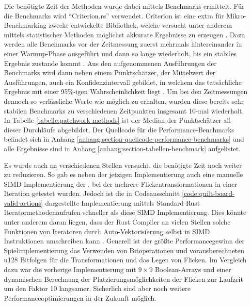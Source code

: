 Die benötigte Zeit der Methoden wurde dabei mittels Benchmarks ermittelt. Für die Benchmarks wird \enquote{Criterion.rs} verwendet. Criterion ist eine extra für Mikro-Benchmarking zwecke entwickelte Bibliothek, welche versucht unter anderem mittels statistischer Methoden möglichst akkurate Ergebnisse zu erzeugen \cite{2018.Criterion}. Dazu werden alle Benchmarks vor der Zeitmessung zuerst mehrmals hintereinander in einer Warmup-Phase ausgeführt und dann so lange wiederholt, bis ein stabiles Ergebnis zustande kommt \cite{2018.CriterionAnalysis}. Aus den aufgenommenen Ausführungen der Benchmarks wird dann neben einem Punktschätzer, der Mittelwert der Ausführungen, auch ein Konfidenzintervall gebildet, in welchem das tatsächliche Ergebnis mit einer 95\%-igen Wahrscheinlichkeit liegt \cite{2019.CriterionOutput}. Um bei den Zeitmessungen dennoch so verlässliche Werte wie möglich zu erhalten, wurden diese bereits sehr stabilen Benchmarks zu verschiedenen Zeitpunkten insgesamt 10-mal wiederholt. In Tabelle \ref{tabelle:patchwork-methods} ist der Median der Punktschätzer all dieser Durchläufe abgebildet. Der Quellcode für die Performance-Benchmarks befindet sich in Anhang \ref{anhang:section-quellcode-performance-benchmarks} und alle Ergebnisse sind in Anhang \ref{anhang:section-tabellen-benchmark} aufgelistet.

Es wurde auch an verschiedenen Stellen versucht, die benötigte Zeit noch weiter zu reduzieren. So gab es neben der jetzigen Implementierung auch eine manuelle \ac{SIMD} Implementierung der , bei der mehrere Flickentransformationen in einer Iteration getestet wurden. Jedoch ist die in Codeausschnitt \ref{code:quilt-board-valid-actions} dargestellte Implementierung mittels Standard-Rust Iteratormethodenaufrufen schneller als diese \ac{SIMD} Implementierung. Dies könnte unter anderem daran liegen, dass der Rust Compiler an vielen Stellen solche Funktionen von Iteratoren durch Auto-Vektorisierung selbst in \ac{SIMD} Instruktionen umschreiben kann \cite{2020.RustAutoVectorization}. Generell ist der größte Performancegewinn der Spielimplementierung das Verwenden von Bitoperationen und vorausberechneten \ac{u128} Bitfolgen für die Transformationen und das Legen von Flicken. Im Vergleich dazu war die vorherige Implementierung mit $9\times 9$ Boolean-Arrays und einer dynamischen Berechnung der Platzierungsmöglichkeiten der Flicken zur Laufzeit um den Faktor 10 langsamer. Sicherlich sind aber noch weitere Performanceoptimierungen in der Zukunft möglich.

